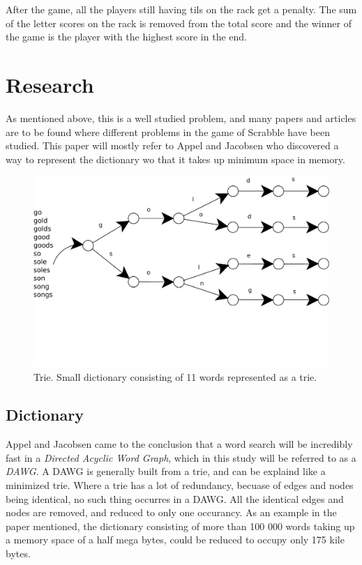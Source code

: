 \documentclass[a4paper, 12pt]{report}
\begin{document}
After the game, all the players still having tils on the rack get a penalty. The sum of the letter scores on the rack is removed from the total score and the winner of the game is the player with the highest score in the end.

\section{Research}
As mentioned above, this is a well studied problem, and many papers and articles are to be found where different problems in the game of Scrabble have been studied. This paper will mostly refer to Appel and Jacobsen \cite{fastest} who discovered a way to represent the dictionary wo that it takes up minimum space in memory.
\begin{figure}[h]
\centering
\includegraphics[scale=0.5]{trie}
\caption{Trie. Small dictionary consisting of 11 words represented as a trie.}
\end{figure}
\subsection{Dictionary}
Appel and Jacobsen \cite{fastest} came to the conclusion that a word search will be incredibly fast in a \emph{Directed Acyclic Word Graph}, which in this study will be referred to as a \emph{DAWG}. A DAWG is generally built from a trie, and can be explaind like a minimized trie. Where a trie has a lot of redundancy, becuase of edges and nodes being identical, no such thing occurres in a DAWG. All the identical edges and nodes are removed, and reduced to only one occurancy. As an example in the paper mentioned, the dictionary consisting of more than 100 000 words taking up a memory space of a half mega bytes, could be reduced to occupy only 175 kile bytes.
\end{document}
